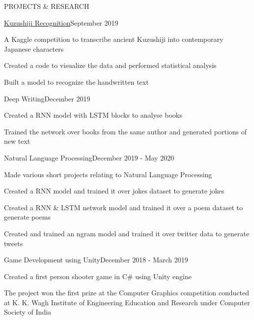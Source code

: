 \documentclass{resume} %
\begin{document}
\begin{rSection}{PROJECTS \& RESEARCH}
\pagebreak

\begin{rSubsection}{\href{https://github.com/obi-wan-shinobi/kuzushiji}{Kuzushiji Recognition}}{September 2019}{}{}
\item A Kaggle competition to transcribe ancient Kuzushiji into contemporary Japanese characters
\item Created a code to visualize the data and performed statistical analysis
\item Built a model to recognize the handwritten text
\end{rSubsection}

\begin{rSubsection}{Deep Writing}{December 2019}{}{}
\item Created a RNN model with LSTM blocks to analyse books
\item Trained the network over books from the same author and generated portions of new text
\end{rSubsection}

\begin{rSubsection}{Natural Language Processing}{December 2019 - May 2020}{}{}
\item Made various short projects relating to Natural Language Processing
\item Created a RNN model and trained it over jokes dataset to generate jokes
\item Created a RNN \& LSTM network model and trained it over a poem dataset to generate poems
\item Created and trained an ngram model and trained it over twitter data to generate tweets
\end{rSubsection}

\begin{rSubsection}{Game Development using Unity}{December 2018 - March 2019}{}{}
\item Created a first person shooter game in C\# using Unity engine
\item The project won the first prize at the Computer Graphics competition conducted at K. K. Wagh Institute of Engineering Education and Research under Computer Society of India
\end{rSubsection}

\end{rSection}
\end{document}
